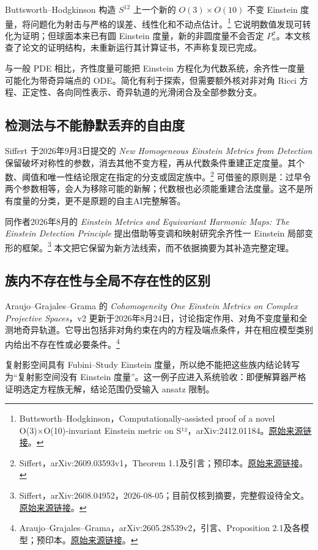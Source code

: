 \documentclass[11pt,a4paper]{article}
\theoremstyle{definition}
\newcommand{\src}[3]{\footnote{\raggedright #1，#2。\href{#3}{原始来源链接}。}}
\begin{document}
Buttsworth--Hodgkinson 构造 $S^{12}$ 上一个新的 $O(3)\times O(10)$ 不变 Einstein 度量，将问题化为射击与严格的误差、线性化和不动点估计。\src{Buttsworth--Hodgkinson}{Computationally-assisted proof of a novel O(3)×O(10)-invariant Einstein metric on S¹²，arXiv:2412.01184}{https://arxiv.org/abs/2412.01184}
它说明数值发现可转化为证明；但球面本来已有圆 Einstein 度量，新的非圆度量不会否定 $P_n^\sigma$。本文核查了论文的证明结构，未重新运行其计算证书，不声称复现已完成。

与一般 PDE 相比，齐性度量可能把 Einstein 方程化为代数系统，余齐性一度量可能化为带奇异端点的 ODE。简化有利于探索，但需要额外核对非对角 Ricci 方程、正定性、各向同性表示、奇异轨道的光滑闭合及全部参数分支。

\subsection{检测法与不能静默丢弃的自由度}

Siffert 于2026年9月3日提交的 \emph{New Homogeneous Einstein Metrics from Detection} 保留破坏对称性的参数，消去其他不变方程，再从代数条件重建正定度量。其个数、阈值和唯一性结论限定在指定的分支或固定族中。\src{Siffert}{arXiv:2609.03593v1，Theorem 1.1及引言；预印本}{https://arxiv.org/html/2609.03593v1}
可借鉴的原则是：过早令两个参数相等，会人为移除可能的新解；代数根也必须能重建合法度量。这不是所有度量的分类，更不是原题的自主AI完整解答。

同作者2026年8月的 \emph{Einstein Metrics and Equivariant Harmonic Maps: The Einstein Detection Principle} 提出借助等变调和映射研究余齐性一 Einstein 局部变形的框架。\src{Siffert}{arXiv:2608.04952，2026-08-05；目前仅核到摘要，完整假设待全文}{https://arxiv.org/abs/2608.04952}
本文把它保留为新方法线索，而不依据摘要为其补造完整定理。

\subsection{族内不存在性与全局不存在性的区别}

Araujo--Grajales--Grama 的 \emph{Cohomogeneity One Einstein Metrics on Complex Projective Spaces}，v2 更新于2026年8月24日，讨论指定作用、对角不变度量和全测地奇异轨道。它导出包括非对角约束在内的方程及端点条件，并在相应模型类别内给出不存在性或必要条件。\src{Araujo--Grajales--Grama}{arXiv:2605.28539v2，引言、Proposition 2.1及各模型；预印本}{https://arxiv.org/html/2605.28539v2}

复射影空间具有 Fubini--Study Einstein 度量，所以绝不能把这些族内结论转写为“复射影空间没有 Einstein 度量”。这一例子应进入系统验收：即便解算器严格证明选定方程族无解，结论范围仍受输入 ansatz 限制。
\end{document}
